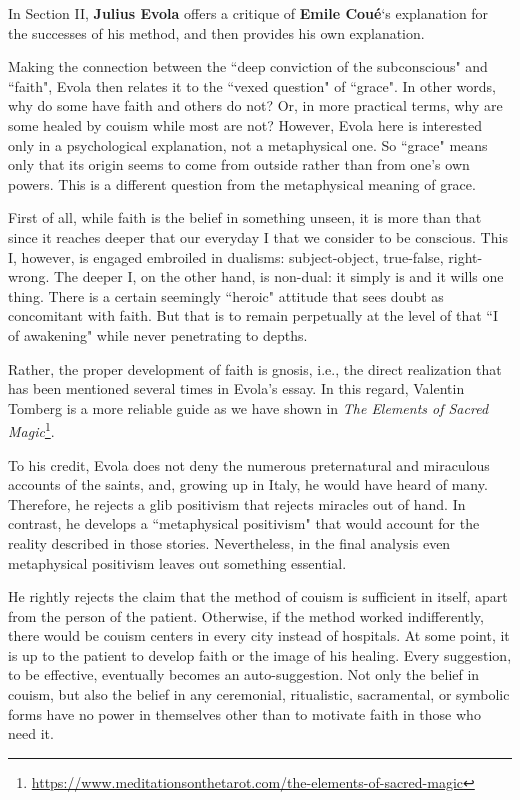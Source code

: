 \hfill

\begin{quotationx}
In Section II, \textbf{Julius Evola} offers a critique of \textbf{Emile Coué}`s explanation for the successes of his method, and then provides his own explanation.

Making the connection between the ``deep conviction of the subconscious" and ``faith", Evola then relates it to the ``vexed question" of ``grace". In other words, why do some have faith and others do not? Or, in more practical terms, why are some healed by couism while most are not? However, Evola here is interested only in a psychological explanation, not a metaphysical one. So ``grace" means only that its origin seems to come from outside rather than from one's own powers. This is a different question from the metaphysical meaning of grace.

First of all, while faith is the belief in something unseen, it is more than that since it reaches deeper that our everyday I that we consider to be conscious. This I, however, is engaged embroiled in dualisms: subject-object, true-false, right-wrong. The deeper I, on the other hand, is non-dual: it simply is and it wills one thing. There is a certain seemingly ``heroic" attitude that sees doubt as concomitant with faith. But that is to remain perpetually at the level of that ``I of awakening" while never penetrating to depths.

Rather, the proper development of faith is gnosis, i.e., the direct realization that has been mentioned several times in Evola's essay. In this regard, Valentin Tomberg is a more reliable guide as we have shown in \textit{The Elements of Sacred Magic}\footnote{\url{https://www.meditationsonthetarot.com/the-elements-of-sacred-magic}}.

To his credit, Evola does not deny the numerous preternatural and miraculous accounts of the saints, and, growing up in Italy, he would have heard of many. Therefore, he rejects a glib positivism that rejects miracles out of hand. In contrast, he develops a ``metaphysical positivism" that would account for the reality described in those stories. Nevertheless, in the final analysis even metaphysical positivism leaves out something essential.

He rightly rejects the claim that the method of couism is sufficient in itself, apart from the person of the patient. Otherwise, if the method worked indifferently, there would be couism centers in every city instead of hospitals. At some point, it is up to the patient to develop faith or the image of his healing. Every suggestion, to be effective, eventually becomes an auto-suggestion. Not only the belief in couism, but also the belief in any ceremonial, ritualistic, sacramental, or symbolic forms have no power in themselves other than to motivate faith in those who need it.


\end{quotationx}
